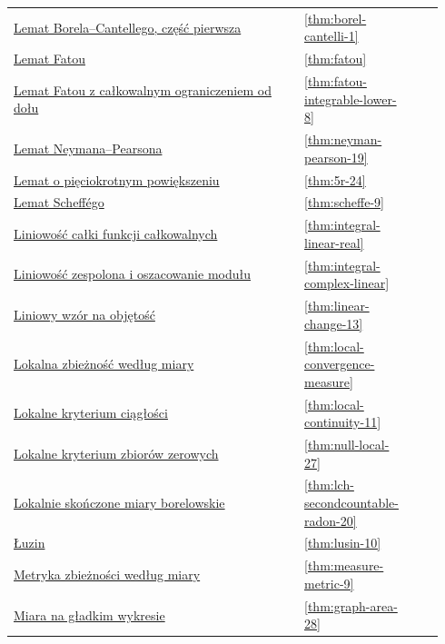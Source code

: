 \documentclass[11pt,a4paper,oneside]{book}
\numberwithin{equation}{chapter}
\theoremstyle{plain}
\theoremstyle{definition}
\theoremstyle{remark}
\begin{document}
\begin{longtable}{@{}p{0.72\linewidth}p{0.135\linewidth}p{0.08\linewidth}@{}}
\hyperref[thm:borel-cantelli-1]{Lemat Borela--Cantellego, część pierwsza} & \ref*{thm:borel-cantelli-1} & \pageref*{thm:borel-cantelli-1} \\
\hyperref[thm:fatou]{Lemat Fatou} & \ref*{thm:fatou} & \pageref*{thm:fatou} \\
\hyperref[thm:fatou-integrable-lower-8]{Lemat Fatou z całkowalnym ograniczeniem od dołu} & \ref*{thm:fatou-integrable-lower-8} & \pageref*{thm:fatou-integrable-lower-8} \\
\hyperref[thm:neyman-pearson-19]{Lemat Neymana--Pearsona} & \ref*{thm:neyman-pearson-19} & \pageref*{thm:neyman-pearson-19} \\
\hyperref[thm:5r-24]{Lemat o pięciokrotnym powiększeniu} & \ref*{thm:5r-24} & \pageref*{thm:5r-24} \\
\hyperref[thm:scheffe-9]{Lemat Scheffégo} & \ref*{thm:scheffe-9} & \pageref*{thm:scheffe-9} \\
\hyperref[thm:integral-linear-real]{Liniowość całki funkcji całkowalnych} & \ref*{thm:integral-linear-real} & \pageref*{thm:integral-linear-real} \\
\hyperref[thm:integral-complex-linear]{Liniowość zespolona i oszacowanie modułu} & \ref*{thm:integral-complex-linear} & \pageref*{thm:integral-complex-linear} \\
\hyperref[thm:linear-change-13]{Liniowy wzór na objętość} & \ref*{thm:linear-change-13} & \pageref*{thm:linear-change-13} \\
\hyperref[thm:local-convergence-measure]{Lokalna zbieżność według miary} & \ref*{thm:local-convergence-measure} & \pageref*{thm:local-convergence-measure} \\
\hyperref[thm:local-continuity-11]{Lokalne kryterium ciągłości} & \ref*{thm:local-continuity-11} & \pageref*{thm:local-continuity-11} \\
\hyperref[thm:null-local-27]{Lokalne kryterium zbiorów zerowych} & \ref*{thm:null-local-27} & \pageref*{thm:null-local-27} \\
\hyperref[thm:lch-secondcountable-radon-20]{Lokalnie skończone miary borelowskie} & \ref*{thm:lch-secondcountable-radon-20} & \pageref*{thm:lch-secondcountable-radon-20} \\
\hyperref[thm:lusin-10]{Łuzin} & \ref*{thm:lusin-10} & \pageref*{thm:lusin-10} \\
\hyperref[thm:measure-metric-9]{Metryka zbieżności według miary} & \ref*{thm:measure-metric-9} & \pageref*{thm:measure-metric-9} \\
\hyperref[thm:graph-area-28]{Miara na gładkim wykresie} & \ref*{thm:graph-area-28} & \pageref*{thm:graph-area-28} \\

\end{longtable}
\end{document}

